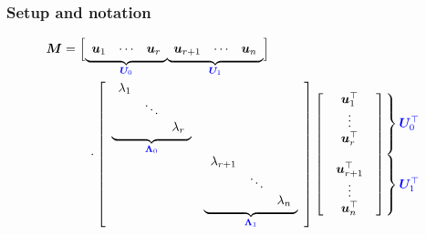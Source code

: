 \documentclass[compress,
mathserif,wide,%
]{beamer}
\begin{document}
\begin{frame}
\frametitle{Setup and notation}



{\small
\begin{align*}
\bm{M} & =\Big[\underset{\textcolor{blue}{ \bm{U}_{0}}}{\underbrace{\begin{array}{ccc}
\bm{u}_{1} & \cdots & \bm{u}_{r}\end{array}}}\underset{\textcolor{blue}{ \bm{U}_{1}}}{\underbrace{\begin{array}{ccc}
\bm{u}_{r+1} & \cdots & \bm{u}_{n}\end{array}}}\Big]\\
 & \qquad\cdot \left[\begin{array}{cc}
\underset{\textcolor{blue}{ \bm{\Lambda}_{0}}}{\underbrace{\begin{array}{ccc}
\lambda_{1}\\
 & \ddots\\
 &  & \lambda_{r}
\end{array}}}\\
 & \underset{\textcolor{blue}{ \bm{\Lambda}_{1}}}{\underbrace{\begin{array}{ccc}
\lambda_{r+1}\\
 & \ddots\\
 &  & \lambda_{n}
\end{array}}}
\end{array}\right]\left[\begin{array}{c}
\begin{array}{c}
\bm{u}_{1}^{\top}\\
\vdots\\
\bm{u}_{r}^{\top}
\end{array}\\
\begin{array}{c}
\\
\bm{u}_{r+1}^{\top}\\
\vdots\\
\bm{u}_{n}^{\top}
\end{array}
\end{array}\right]
\hspace{-1.7em}\begin{array}{c}
\left.\begin{array}{c}
\\
\\
\\
\\
\end{array}\right\} \textcolor{blue}{ \bm{U}_{0}^{\top}}\\
\left.\begin{array}{c}
\\
\\
\\
\\
\end{array}\right\} \textcolor{blue}{ \bm{U}_{1}^{\top}}
\end{array}
\end{align*}


}

\end{frame}
\end{document}

